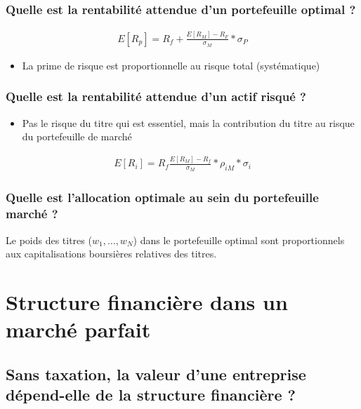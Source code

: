 \subsection{Quelle est la rentabilité attendue d'un portefeuille optimal ?}

\begin{align*}
    E[R_p] = R_f + \frac{E[R_M] - R_F}{\sigma_M} * \sigma_P
\end{align*}
\begin{itemize}
    \item La prime de risque est proportionnelle au risque total (systématique)
\end{itemize}

\subsection{Quelle est la rentabilité attendue d'un actif risqué ?}

\begin{itemize}
    \item Pas le risque du titre qui est essentiel, mais la contribution du titre au risque du portefeuille de marché
\end{itemize}
\begin{align*}
    E[R_i] = R_f \frac{E[R_M] - R_f}{\sigma_M} * \rho_{iM} * \sigma_i
\end{align*}

\subsection{Quelle est l'allocation optimale au sein du portefeuille marché ?}

Le poids des titres ($w_1, \ldots, w_N$) dans le portefeuille optimal sont proportionnels aux capitalisations boursières relatives des titres.

\addtocounter{chapter}{2}
\chapter{Structure financière dans un marché parfait}

\section{Sans taxation, la valeur d'une entreprise dépend-elle de la structure financière ?}

